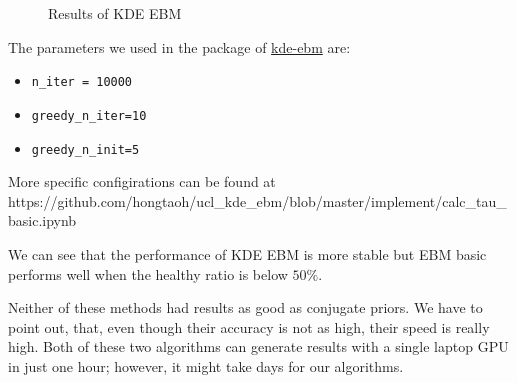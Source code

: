 \documentclass[
  letterpaper,
  DIV=11,
  numbers=noendperiod]{scrreprt}
\providecommand{\tightlist}{%
  \setlength{\itemsep}{0pt}\setlength{\parskip}{0pt}}\usepackage{longtable,booktabs,array}
\begin{document}
\begin{figure}


\caption{\label{fig-res-ebm-kde}Results of KDE EBM}

\end{figure}%

The parameters we used in the package of
\href{https://github.com/ucl-pond/kde_ebm}{kde-ebm} are:

\begin{itemize}
\tightlist
\item
  \texttt{n\_iter\ =\ 10000}
\item
  \texttt{greedy\_n\_iter=10}
\item
  \texttt{greedy\_n\_init=5}
\end{itemize}

More specific configirations can be found at
https://github.com/hongtaoh/ucl\_kde\_ebm/blob/master/implement/calc\_tau\_basic.ipynb

We can see that the performance of KDE EBM is more stable but EBM basic
performs well when the healthy ratio is below \(50\%\).

Neither of these methods had results as good as conjugate priors. We
have to point out, that, even though their accuracy is not as high,
their speed is really high. Both of these two algorithms can generate
results with a single laptop GPU in just one hour; however, it might
take days for our algorithms.
\end{document}
